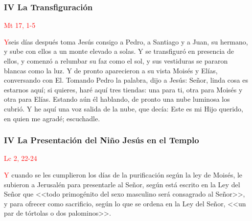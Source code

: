 \documentclass[10pt,twoside]{book}
\begin{document}


\begin{paracol}{2}
      \begin{leftcolumn}

            \noindent\subsubsection*{IV La Transfiguración}
            
            \vspace{-0.5em}

            \hfill\textcolor{red}{Mt 17, 1-5}

            \lettrine[lines=2]{\textcolor{red}{Y}}\space seis días después toma Jesús consigo a Pedro, a Santiago y a Juan, su hermano, y sube con ellos a un monte elevado a solas. Y se transfiguró
            en presencia de ellos, y comenzó a relumbar su faz como el sol, y sus vestiduras se pararon blancas como la luz. Y de pronto aparecieron a su vista Moisés y Elías, conversando con El.
            Tomando Pedro la palabra, dijo a Jesús: Señor, linda cosa es estarnos aquí; si quieres, haré aquí tres tiendas: una para ti, otra para Moisés y otra para Elías. Estando aún él hablando,
            de pronto una nube luminosa los cubrió. Y he aquí una voz salida de la nube, que decía: Este es mi Hijo querido, en quien me agradé; escuchadle.
      \end{leftcolumn}
      \begin{rightcolumn}

            \noindent\subsubsection*{IV La Presentación del Niño Jesús en el Templo}

            \vspace{-0.5em}

            \hfill\textcolor{red}{Lc 2, 22-24}

            \lettrine[lines=2]{\textcolor{red}{Y}}\space{} cuando se les cumplieron los días de la purificación según la ley de Moisés, le subieron a Jerusalén para presentarle al Señor,
            según está escrito en la Ley del Señor que <<todo primogénito del sexo masculino será consagrado al Señor>>, y para ofrecer como sacrificio,
            según lo que se ordena en la Ley del Señor, <<un par de tórtolas o dos palominos>>.
      \end{rightcolumn}
\end{paracol}
\end{document}
